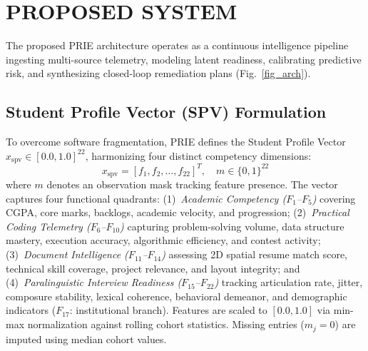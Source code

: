 \documentclass[conference]{IEEEtran}
\begin{document}
\section{PROPOSED SYSTEM}

The proposed PRIE architecture operates as a continuous intelligence pipeline ingesting multi-source telemetry, modeling latent readiness, calibrating predictive risk, and synthesizing closed-loop remediation plans (Fig.~\ref{fig_arch}).

\subsection{Student Profile Vector (SPV) Formulation}
To overcome software fragmentation, PRIE defines the Student Profile Vector $x_{\text{spv}} \in [0.0, 1.0]^{22}$, harmonizing four distinct competency dimensions:
\begin{equation}
x_{\text{spv}} = [f_1, f_2, \dots, f_{22}]^T, \quad m \in \{0, 1\}^{22}
\end{equation}
where $m$ denotes an observation mask tracking feature presence. The vector captures four functional quadrants: (1)~\textit{Academic Competency ($F_1$--$F_5$)} covering CGPA, core marks, backlogs, academic velocity, and progression; (2)~\textit{Practical Coding Telemetry ($F_6$--$F_{10}$)} capturing problem-solving volume, data structure mastery, execution accuracy, algorithmic efficiency, and contest activity; (3)~\textit{Document Intelligence ($F_{11}$--$F_{14}$)} assessing 2D spatial resume match score, technical skill coverage, project relevance, and layout integrity; and (4)~\textit{Paralinguistic Interview Readiness ($F_{15}$--$F_{22}$)} tracking articulation rate, jitter, composure stability, lexical coherence, behavioral demeanor, and demographic indicators ($F_{17}$: institutional branch). Features are scaled to $[0.0, 1.0]$ via min-max normalization against rolling cohort statistics. Missing entries ($m_j = 0$) are imputed using median cohort values.
\end{document}
